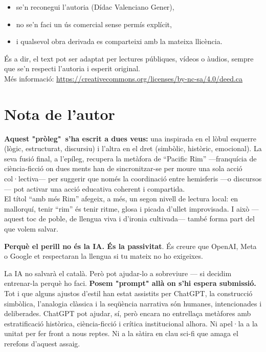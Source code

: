 \documentclass[12pt,a4paper]{article}
\begin{document}
\begin{itemize}
	\item se’n reconegui l’autoria (Dídac Valenciano Gener),
	\item no se’n faci un ús comercial sense permís explícit,
	\item i qualsevol obra derivada es comparteixi amb la mateixa llicència.
\end{itemize}
 
És a dir, el text pot ser adaptat per lectures públiques, vídeos o àudios, sempre que se’n respecti l’autoria i esperit original.\\
 
Més informació: \url{https://creativecommons.org/licenses/by-nc-sa/4.0/deed.ca}


	\section*{Nota de l’autor}
	
\textbf{Aquest "pròleg"~s’ha escrit a dues veus:} una inspirada en el lòbul esquerre (lògic, estructurat, discursiu) i l’altra en el dret (simbòlic, històric, emocional). La seva fusió final, a l’epíleg, recupera la metàfora de “Pacific Rim” —franquícia de ciència-ficció on dues ments han de sincronitzar-se per moure una sola acció col·lectiva— per suggerir que només la coordinació entre hemisferis —o discursos— pot activar una acció educativa coherent i compartida.\\

El títol “amb més Rim” afegeix, a més, un segon nivell de lectura local: en mallorquí, tenir “rim” és tenir ritme, glosa i picada d’ullet improvisada. I això —aquest toc de poble, de llengua viva i d’ironia cultivada— també forma part del que volem salvar.

\textbf{Perquè el perill no és la IA. És la passivitat}. És creure que OpenAI, Meta o Google et respectaran la llengua si tu mateix no ho exigeixes.

La IA no salvarà el català. Però pot ajudar-lo a sobreviure — si decidim entrenar-la perquè ho faci. \textbf{Posem "prompt" allà on s'hi espera submissió.}\\

	
	 Tot i que alguns ajustos d’estil han estat assistits per ChatGPT, la construcció sim\-bò\-li\-ca, l’analogia clàssica i la seqüència narrativa són humanes, intencionades i deliberades. ChatGPT pot ajudar, sí, però encara no entrellaça metàfores amb estratificació històrica, ciència-ficció i crítica institucional alhora. Ni apel·la a la unitat per fer front a nous reptes. Ni a la sàtira en clau sci-fi que amaga el rerefons d'aquest assaig.
	
\end{document}
